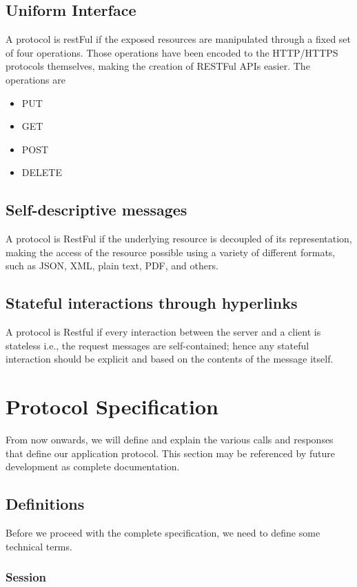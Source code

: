 			\subsection{Uniform Interface}
				A protocol is restFul if the exposed resources are manipulated through a fixed set of four operations. Those operations 
				have been encoded to the HTTP/HTTPS protocols themselves, making the creation of RESTFul APIs easier. The operations are
				\begin{itemize}
					\item PUT
					\item GET
					\item POST
					\item DELETE
				\end{itemize}
			\subsection{Self-descriptive messages}
				A protocol is RestFul if the underlying resource is decoupled of its representation, making the access of the resource possible 
				using a variety of different formats, such as JSON, XML, plain text, PDF, and others.
			\subsection{Stateful interactions through hyperlinks}
				A protocol is Restful if every interaction between the server and a client is stateless i.e., the request messages 
				are self-contained; hence any stateful interaction should be explicit and based on the contents of the message itself.
		\section{Protocol Specification}
			From now onwards, we will define and explain the various calls and responses that define our application protocol. This section 
			may be referenced by future development as complete documentation.
			\subsection{Definitions}
				Before we proceed with the complete specification, we need to define some technical terms.
				\subsubsection{Session}
					\label{session}
					

